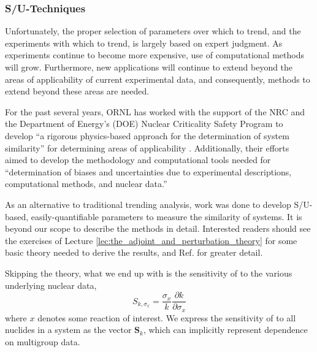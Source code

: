 
\subsubsection{S/U-Techniques}

Unfortunately, the proper selection of parameters over which to trend, 
and the experiments with which to trend, is largely based on expert 
judgment.  As experiments continue to become more expensive, use of 
computational methods will grow.  Furthermore, new applications will 
continue to extend beyond the areas of applicability of current 
experimental data, and consequently, methods to extend beyond these 
areas are needed.

For the past several years, ORNL has worked with the support of the 
NRC and the Department of Energy's (DOE) Nuclear Criticality Safety 
Program to develop ``a rigorous physics-based approach for the 
determination of system similarity'' for determining areas of 
applicability \cite{broadhead2004sau}.  Additionally, their efforts 
aimed to develop the methodology and computational tools needed for 
``determination of biases and uncertainties due to experimental 
descriptions, computational methods, and nuclear data.''

As an alternative to traditional trending analysis, work was done to 
develop S/U-based, easily-quantifiable parameters to measure the 
similarity of systems.  It is beyond our scope to describe the 
methods in detail.  Interested readers should see the exercises
of Lecture \ref{lec:the_adjoint_and_perturbation_theory} for some
basic theory needed to derive the results, and Ref. 
\cite{broadhead2004sau} for greater detail.

Skipping the theory, what we end up with is the sensitivity
of \keff to the various underlying nuclear data, 
\begin{equation}
 S_{k,\sigma_x} = \frac{\sigma_x}{k}\frac{\partial k}{\partial \sigma_x} 
 \label{eq:keffsens}
\end{equation}
where $x$ denotes some reaction of interest.  We express the sensitivity 
of \keff to all nuclides in a system as the vector $\mathbf{S}_k$,
which can implicitly represent dependence on multigroup data.

